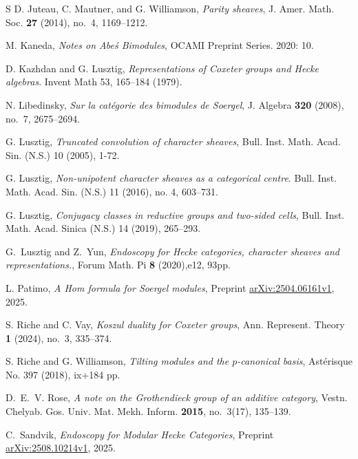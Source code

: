 \documentclass{amsart}
\theoremstyle{definition}
\numberwithin{equation}{subsection}
\begin{document}
\begin{thebibliography}{S}
        D. Juteau, C. Mautner, and G. Williamson, \emph{Parity sheaves}, J. Amer. Math. Soc. {\bf 27} (2014), no.~4, 1169--1212.

        M. Kaneda, \emph{Notes on Abe\'s Bimodules}, OCAMI Preprint Series. 2020: 10.

        D. Kazhdan and G. Lusztig, \emph{Representations of Coxeter groups and Hecke algebras}. Invent Math 53, 165–184 (1979).

        N. Libedinsky, \emph{Sur la cat\'egorie des bimodules de Soergel}, J. Algebra {\bf 320} (2008), no.~7, 2675--2694.

        G. Lusztig, \emph{Truncated convolution of character sheaves}, Bull. Inst. Math. Acad. Sin. (N.S.) 10 (2005), 1-72.

        G. Lusztig, \emph{Non-unipotent character sheaves as a categorical centre}. Bull. Inst. Math. Acad. Sin. (N.S.) 11 (2016), no. 4, 603–731.

        G. Lusztig, \emph{Conjugacy classes in reductive groups and two-sided cells}, Bull. Inst. Math. Acad. Sinica (N.S.) 14 (2019), 265–293.

	G.~Lusztig and Z.~Yun, \emph{Endoscopy for Hecke categories, character sheaves and representations.}, Forum Math. Pi \textbf{8} (2020),e12, 93pp.

        L. Patimo, \emph{A Hom formula for Soergel modules}, Preprint \href{https://arxiv.org/abs/2504.06161v1}{arXiv:2504.06161v1}, 2025.

        S. Riche and C. Vay, \emph{Koszul duality for Coxeter groups}, Ann. Represent. Theory {\bf 1} (2024), no.~3, 335--374.

        S. Riche and G. Williamson, \emph{Tilting modules and the $p$-canonical basis}, Ast\'erisque No. 397 (2018), ix+184 pp.

        D.~E.~V. Rose, \emph{A note on the Grothendieck group of an additive category}, Vestn. Chelyab. Gos. Univ. Mat. Mekh. Inform. {\bf 2015}, no.~3(17), 135--139.

        C.~Sandvik, \emph{Endoscopy for Modular Hecke Categories}, Preprint \href{https://arxiv.org/abs/2508.10214v1}{arXiv:2508.10214v1}, 2025.


\end{thebibliography}
\end{document}
